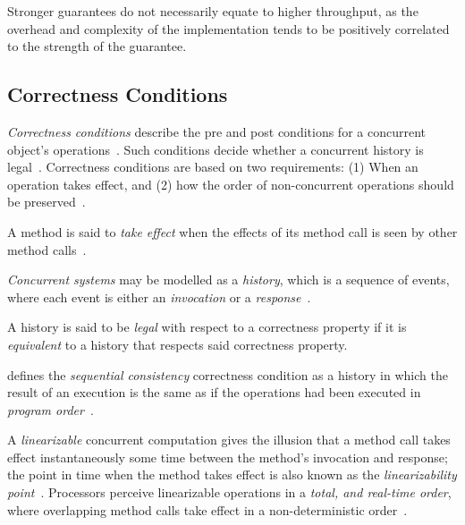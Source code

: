 Stronger guarantees do not necessarily equate to higher throughput, as the
overhead and complexity of the implementation tends to be positively
correlated to the strength of the guarantee.

\subsection{Correctness Conditions}
\label{sec:correctness_conditions}
\emph{Correctness conditions} describe the pre and post conditions for a concurrent
object's operations~\citep{herlihy2020art}. Such conditions decide
whether a concurrent history is legal~\citep{herlihy1990linearizability}.
Correctness conditions are based on two requirements: (1) When an
operation takes effect, and (2) how the order of non-concurrent operations
should be preserved~\citep{herlihy1990linearizability}.

A method is said to \emph{take effect} when the effects of its method call is
seen by other method calls~\citep[Section~3.4.1]{herlihy2020art}. 

\emph{Concurrent systems} may be modelled as a \emph{history}, which is a
sequence of events, where each event is either an \emph{invocation} or a
\emph{response}~\citep[Section~3.6.1]{herlihy2020art}. 

A history is said to be \emph{legal} with respect to a correctness property if
it is \emph{equivalent} to a history that respects said correctness property.

\citeauthor{lamport1979make} defines the \emph{sequential consistency}
correctness condition as a history in which the result of an execution is the
same as if the operations had been executed in \emph{program
order}~\citep{lamport1979make}.

A \emph{linearizable} concurrent computation gives the illusion that a method
call takes effect instantaneously some time between the method's invocation and
response; the point in time when the method takes effect is also known as the
\emph{linearizability point}~\citep{herlihy2020art,herlihy1990linearizability}.
Processors perceive linearizable operations in a \emph{total, and real-time
order}, where overlapping method calls take effect in a non-deterministic
order~\citep[Section~3.6.2]{herlihy2020art}.



